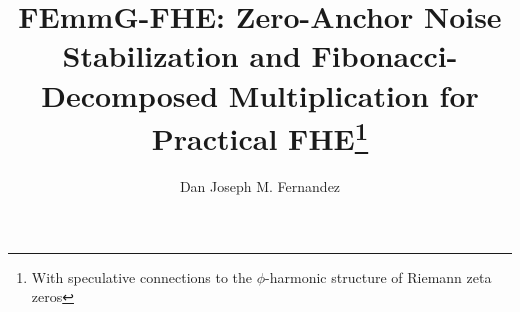 
\title{FEmmG-FHE: Zero-Anchor Noise Stabilization and Fibonacci-Decomposed Multiplication for Practical FHE\thanks{With speculative connections to the $\phi$-harmonic structure of Riemann zeta zeros}}

\author{Dan Joseph M. Fernandez}

